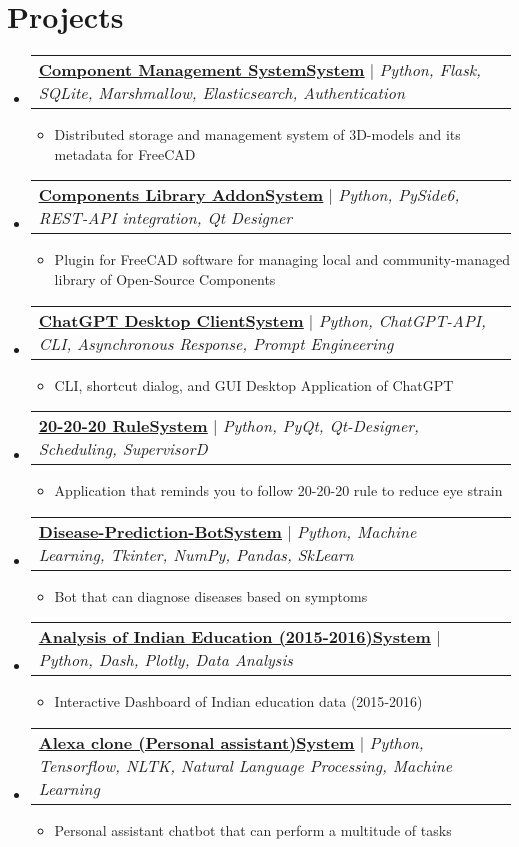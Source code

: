 \documentclass[letterpaper,11pt]{article}%
\makeatletter
\newcommand{\resumeItem}[1]{
  \item\small{
    {#1 \vspace{-2pt}}
  }
}
\newcommand{\resumeProjectHeading}[2]{
    \item
    \begin{tabular*}{0.97\textwidth}{l@{\extracolsep{\fill}}r}
      \small#1 & #2 \\
    \end{tabular*}\vspace{-7pt}
}
\newcommand{\resumeSubHeadingListStart}{\begin{itemize}[leftmargin=0.15in, label={}]}
\newcommand{\resumeSubHeadingListEnd}{\end{itemize}}
\newcommand{\resumeItemListStart}{\begin{itemize}}
\newcommand{\resumeItemListEnd}{\end{itemize}\vspace{-5pt}}
\makeatother
\begin{document}
\section{Projects}%
\label{sec:Projects}%

%
\resumeSubHeadingListStart%
\resumeProjectHeading%
{\textbf{\href{https://github.com/AmulyaParitosh/Component-Management-System}{\underline{Component Management SystemSystem}}} $|$ \footnotesize\emph{Python, Flask, SQLite, Marshmallow, Elasticsearch, Authentication}}{}%
\resumeItemListStart%
\resumeItem{Distributed storage and management system of 3D{-}models and its metadata for FreeCAD}%
\resumeItemListEnd%
\resumeProjectHeading%
{\textbf{\href{https://github.com/AmulyaParitosh/Component_Library_Plugin}{\underline{Components Library AddonSystem}}} $|$ \footnotesize\emph{Python, PySide6, REST-API integration, Qt Designer}}{}%
\resumeItemListStart%
\resumeItem{Plugin for FreeCAD software for managing local and community{-}managed library of Open{-}Source Components}%
\resumeItemListEnd%
\resumeProjectHeading%
{\textbf{\href{https://github.com/AmulyaParitosh/chatGPT_Client}{\underline{ChatGPT Desktop ClientSystem}}} $|$ \footnotesize\emph{Python, ChatGPT-API, CLI, Asynchronous Response, Prompt Engineering}}{}%
\resumeItemListStart%
\resumeItem{CLI, shortcut dialog, and GUI Desktop Application of ChatGPT}%
\resumeItemListEnd%
\resumeProjectHeading%
{\textbf{\href{https://github.com/AmulyaParitosh/20_20_20-Rule-Reduce-Eye-Strain-}{\underline{20-20-20 RuleSystem}}} $|$ \footnotesize\emph{Python, PyQt, Qt-Designer, Scheduling, SupervisorD}}{}%
\resumeItemListStart%
\resumeItem{Application that reminds you to follow 20{-}20{-}20 rule to reduce eye strain}%
\resumeItemListEnd%
\resumeProjectHeading%
{\textbf{\href{https://github.com/AmulyaParitosh/Disease-Pridiction-Bot}{\underline{Disease-Prediction-BotSystem}}} $|$ \footnotesize\emph{Python, Machine Learning, Tkinter, NumPy, Pandas, SkLearn}}{}%
\resumeItemListStart%
\resumeItem{Bot that can diagnose diseases based on symptoms}%
\resumeItemListEnd%
\resumeProjectHeading%
{\textbf{\href{https://github.com/AmulyaParitosh/Indian-Education-2016}{\underline{Analysis of Indian Education (2015-2016)System}}} $|$ \footnotesize\emph{Python, Dash, Plotly, Data Analysis}}{}%
\resumeItemListStart%
\resumeItem{Interactive Dashboard of Indian education data (2015{-}2016)}%
\resumeItemListEnd%
\resumeProjectHeading%
{\textbf{\href{https://github.com/AmulyaParitosh/Virtual-Assistant}{\underline{Alexa clone (Personal assistant)System}}} $|$ \footnotesize\emph{Python, Tensorflow, NLTK, Natural Language Processing, Machine Learning}}{}%
\resumeItemListStart%
\resumeItem{Personal assistant chatbot that can perform a multitude of tasks}%
\resumeItemListEnd%
\resumeSubHeadingListEnd%
\end{document}
